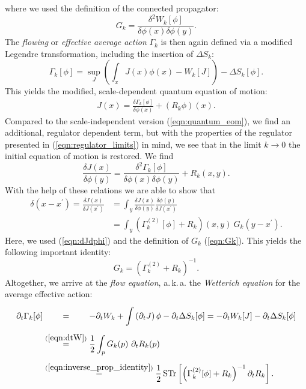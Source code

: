 where we used the definition of the connected propagator:
\begin{equation}
G_k = \frac{\delta^2 W_k[\phi]}{\delta\phi(x)\delta\phi(y)}.
\label{eqn:Gk}
\end{equation}
The \textit{flowing} or \textit{effective average action} $\Gamma_k$ is then again defined via a modified Legendre transformation, including the insertion of $\Delta S_k$:
\begin{equation}
	\Gamma_{k}[\phi]=\sup _{J}\left(\int_x J(x) \phi(x)-W_{k}[J]\right)-\Delta S_{k}[\phi].
\end{equation}
This yields the modified, scale-dependent quantum equation of motion:
\begin{align}
	J(x) = \frac{\delta\Gamma_k[\phi]}{\delta\phi(x)} + \left(R_k\phi\right)(x).
\end{align}
Compared to the scale-independent version (\ref{eqn:quantum_eom}), we find an additional, regulator dependent term, but with the properties of the regulator presented in (\ref{eqn:regulator_limits}) in mind, we see that in the limit $k\rightarrow 0 $ the initial equation of motion is restored.
We find
\begin{equation}
	\frac{\delta J(x)}{\delta \phi(y)}=\frac{\delta^{2} \Gamma_{k}[\phi]}{\delta \phi(x) \delta \phi(y)}+R_{k}(x, y).\label{eqn:dJdphi}
\end{equation}
With the help of these relations we are able to show that 
\begin{equation}
\begin{aligned} \delta\left(x-x^{\prime}\right) =\frac{\delta J(x)}{\delta J\left(x^{\prime}\right)}&=\int_y \frac{\delta J(x)}{\delta \phi(y)} \frac{\delta \phi(y)}{\delta J\left(x^{\prime}\right)} \\[10pt] &=\int_y\left(\Gamma_{k}^{(2)}[\phi]+R_{k}\right)(x, y) \ G_{k}\left(y-x^{\prime}\right).
\end{aligned}
\end{equation}
Here, we used (\ref{eqn:dJdphi}) and the definition of $G_k$ (\ref{eqn:Gk}). 
This yields the following important identity:
\begin{equation}
	G_k = \left(\Gamma_k^{(2)} + R_k\right)^{-1}.
	\label{eqn:inverse_prop_identity}
\end{equation}
Altogether, we arrive at the \textit{flow equation}, a.\,k.\,a. the \textit{Wetterich equation} for the average effective action:
\begin{equation}
\begin{aligned}
\partial_t \Gamma_k[\phi] &\overset{\phantom{(\ref{eqn:dtW})}}{=} -\partial_t W_k +\int\left(\partial_t J\right) \phi - \partial_t \Delta S_k[\phi] = - \partial_t W_k[J] - \partial_t \Delta S_k[\phi] \\[5pt] 
&\overset{(\ref{eqn:dtW})}{=} \frac{1}{2} \int_p G_{k}(p) \ \partial_{t} R_{k}(p)\\[5pt]
&\overset{(\ref{eqn:inverse_prop_identity})}{=}\frac{1}{2} \operatorname{STr}\left[\left(\Gamma_{k}^{(2)}[\phi]+R_{k}\right)^{-1}\partial_{t} R_{k}\right].
\end{aligned}
\label{eqn:Wetterich}
\end{equation}
